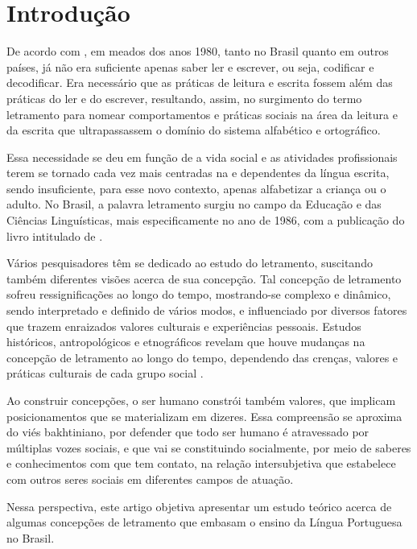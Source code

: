 \documentclass{textolivre}
\begin{document}
\section{Introdução}\label{sec-intro}
De acordo com \textcite{soares2017}, em meados dos anos 1980, tanto no Brasil quanto em
outros países, já não era suficiente apenas saber ler e escrever, ou seja,
codificar e decodificar. Era necessário que as práticas de leitura e escrita
fossem além das práticas do ler e do escrever, resultando, assim, no surgimento
do termo letramento para nomear comportamentos e práticas sociais na área da
leitura e da escrita que ultrapassassem o domínio do sistema alfabético e
ortográfico.

Essa necessidade se deu em função de a vida social e as atividades
profissionais terem se tornado cada vez mais centradas na e dependentes da
língua escrita, sendo insuficiente, para esse novo contexto, apenas alfabetizar
a criança ou o adulto. No Brasil, a palavra letramento surgiu no campo da
Educação e das Ciências Linguísticas, mais especificamente no ano de 1986, com
a publicação do livro intitulado  de 
\cite{soares2017}.

Vários pesquisadores têm se dedicado ao estudo do letramento, suscitando também
diferentes visões acerca de sua concepção. Tal concepção de letramento sofreu
ressignificações ao longo do tempo, mostrando-se complexo e dinâmico, sendo
interpretado e definido de vários modos, e influenciado por diversos fatores
que trazem enraizados valores culturais e experiências pessoais. Estudos
históricos, antropológicos e etnográficos revelam que houve mudanças na
concepção de letramento ao longo do tempo, dependendo das crenças, valores e
práticas culturais de cada grupo social \cite{soares2004}.

Ao construir concepções, o ser humano constrói também valores, que implicam
posicionamentos que se materializam em dizeres. Essa compreensão se aproxima do
viés bakhtiniano, por defender que todo ser humano é atravessado por múltiplas
vozes sociais, e que vai se constituindo socialmente, por meio de saberes e
conhecimentos com que tem contato, na relação intersubjetiva que estabelece com
outros seres sociais em diferentes campos de atuação.

Nessa perspectiva, este artigo objetiva apresentar um estudo teórico acerca de
algumas concepções de letramento que embasam o ensino da Língua Portuguesa no
Brasil.
\end{document}
